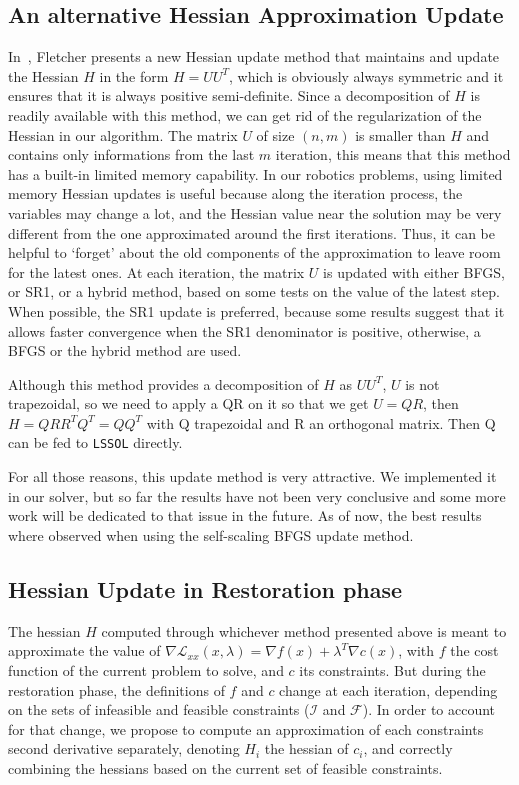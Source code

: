 \subsection{An alternative Hessian Approximation Update}
\label{sub:an_alternative_hessian_approximation_update}

In~\cite{Fletcher:ifip:2006}, Fletcher presents a new Hessian update method that maintains and update the Hessian $H$ in the form $H=U U^T$, which is obviously always symmetric and it ensures that it is always positive semi-definite.
Since a decomposition of $H$ is readily available with this method, we can get rid of the regularization of the Hessian in our algorithm.
The matrix $U$ of size $(n,m)$ is smaller than $H$ and contains only informations from the last $m$ iteration, this means that this method has a built-in limited memory capability.
In our robotics problems, using limited memory Hessian updates is useful because along the iteration process, the variables may change a lot, and the Hessian value near the solution may be very different from the one approximated around the first iterations.
Thus, it can be helpful to `forget' about the old components of the approximation to leave room for the latest ones.
At each iteration, the matrix $U$ is updated with either BFGS, or SR1, or a hybrid method, based on some tests on the value of the latest step.
When possible, the SR1 update is preferred, because some results suggest that it allows faster convergence when the SR1 denominator is positive, otherwise, a BFGS or the hybrid method are used.

Although this method provides a decomposition of $H$ as $U U^T$, $U$ is not trapezoidal, so we need to apply a QR on it so that we get $U=QR$, then $H=Q R R^T Q^T=Q Q^T$ with Q trapezoidal and R an orthogonal matrix.
Then Q can be fed to {\tt LSSOL} directly.

For all those reasons, this update method is very attractive.
We implemented it in our solver, but so far the results have not been very conclusive and some more work will be dedicated to that issue in the future.
As of now, the best results where observed when using the self-scaling BFGS update method.

\subsection{Hessian Update in Restoration phase}
\label{sub:hessian_update_in_restoration_phase}

The hessian $H$ computed through whichever method presented above is meant to approximate the value of $\nabla \mathcal{L}_{xx}(x,\lambda) = \nabla f(x) + \lambda^T \nabla c(x)$, with $f$ the cost function of the current problem to solve, and $c$ its constraints.
But during the restoration phase, the definitions of $f$ and $c$ change at each iteration, depending on the sets of infeasible and feasible constraints ($\mathcal{I}$ and $\mathcal{F}$).
In order to account for that change, we propose to compute an approximation of each constraints second derivative separately, denoting $H_i$ the hessian of $c_i$, and correctly combining the hessians based on the current set of feasible constraints.

